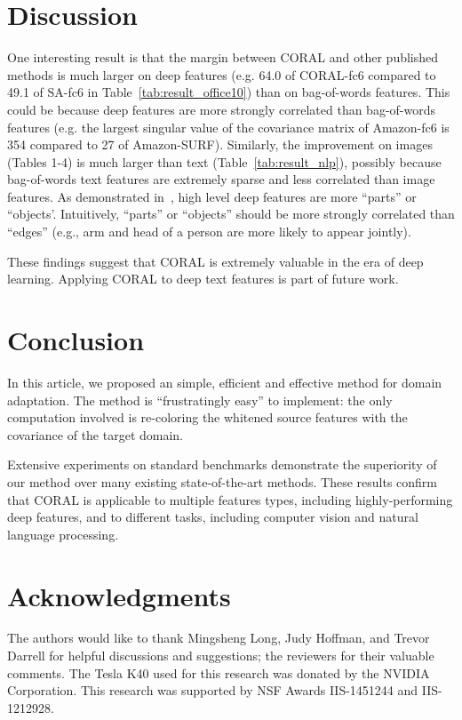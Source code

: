 \documentclass[letterpaper]{article}
\begin{document}
\section{Discussion}
One interesting result is that the margin between CORAL and other published methods is much larger on deep features (e.g. 64.0 of CORAL-fc6 compared to 49.1 of SA-fc6 in Table~\ref{tab:result_office10}) than on bag-of-words features. This could be because deep features are more strongly correlated than bag-of-words features (e.g. the largest singular value of the covariance matrix of Amazon-fc6 is 354 compared to 27 of Amazon-SURF). Similarly, the improvement on images (Tables 1-4) is much larger than text (Table~\ref{tab:result_nlp}), possibly because bag-of-words text features are extremely sparse and less correlated than image features.
As demonstrated in~\cite{deep_vis}, high level deep features are more ``parts'' or ``objects'. Intuitively, ``parts'' or ``objects'' should be more strongly correlated than ``edges'' (e.g., arm and head of a person are more likely to appear jointly).

These findings suggest that CORAL is extremely valuable in the era of deep learning. Applying CORAL to deep text features is part of future work.
\section{Conclusion}
\label{sec:concl}
In this article, we proposed an simple, efficient and effective method for domain adaptation. The method is ``frustratingly easy'' to implement: the only computation involved is re-coloring the whitened source features with the covariance of the target domain. 

Extensive experiments on standard benchmarks demonstrate the superiority of our method over many existing state-of-the-art methods. These results confirm that CORAL is applicable to multiple features types, including highly-performing deep features, and to different tasks, including computer vision and natural language processing. 
\section{Acknowledgments}
\label{sec:ackn}
The authors would like to thank Mingsheng Long, Judy Hoffman, and Trevor Darrell for helpful discussions and suggestions; the reviewers for their valuable comments. The Tesla K40 used for this research was donated by the NVIDIA Corporation. This research was supported by NSF Awards IIS-1451244 and IIS-1212928. 


\end{document}
